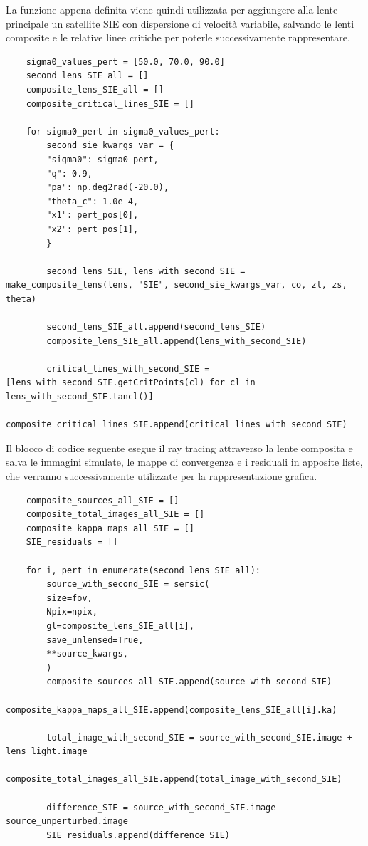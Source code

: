 La funzione appena definita viene quindi utilizzata per aggiungere alla lente principale un satellite SIE con dispersione di velocità variabile, salvando le lenti composite e le relative linee critiche per poterle successivamente rappresentare.
\begin{lstlisting}
    sigma0_values_pert = [50.0, 70.0, 90.0]
    second_lens_SIE_all = []
    composite_lens_SIE_all = []
    composite_critical_lines_SIE = []
    
    for sigma0_pert in sigma0_values_pert:
        second_sie_kwargs_var = {
        "sigma0": sigma0_pert, 
        "q": 0.9,
        "pa": np.deg2rad(-20.0),
        "theta_c": 1.0e-4,
        "x1": pert_pos[0], 
        "x2": pert_pos[1], 
        }
    
        second_lens_SIE, lens_with_second_SIE = make_composite_lens(lens, "SIE", second_sie_kwargs_var, co, zl, zs, theta)

        second_lens_SIE_all.append(second_lens_SIE)
        composite_lens_SIE_all.append(lens_with_second_SIE)

        critical_lines_with_second_SIE = [lens_with_second_SIE.getCritPoints(cl) for cl in lens_with_second_SIE.tancl()]
        composite_critical_lines_SIE.append(critical_lines_with_second_SIE)
\end{lstlisting}
Il blocco di codice seguente esegue il ray tracing attraverso la lente composita e salva le immagini simulate, le mappe di convergenza e i residuali in apposite liste, che verranno successivamente utilizzate per la rappresentazione grafica.
\begin{lstlisting}
    composite_sources_all_SIE = []
    composite_total_images_all_SIE = []
    composite_kappa_maps_all_SIE = []
    SIE_residuals = []
    
    for i, pert in enumerate(second_lens_SIE_all):
        source_with_second_SIE = sersic(
        size=fov,
        Npix=npix,
        gl=composite_lens_SIE_all[i],
        save_unlensed=True,
        **source_kwargs,
        )
        composite_sources_all_SIE.append(source_with_second_SIE)
        composite_kappa_maps_all_SIE.append(composite_lens_SIE_all[i].ka)
    
        total_image_with_second_SIE = source_with_second_SIE.image + lens_light.image
        composite_total_images_all_SIE.append(total_image_with_second_SIE)
    
        difference_SIE = source_with_second_SIE.image - source_unperturbed.image
        SIE_residuals.append(difference_SIE)
        
\end{lstlisting}
